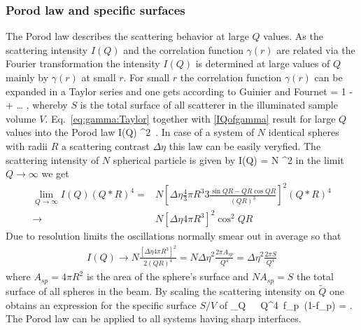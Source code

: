 \subsubsection{Porod law and specific surfaces}

The Porod law describes the scattering behavior at large $Q$ values.
As the scattering intensity $I(Q)$ and the correlation function $\gamma(r)$
are related via the Fourier transformation the intensity $I(Q)$ is determined
at large values of $Q$ mainly by $\gamma(r)$ at small $r$. For small $r$  the
correlation function $\gamma(r)$ can be expanded in a Taylor series and one
gets according to Guinier and Fournet \cite{book:Guinier:Fournet}
\BE
{} = 1 -  \,  + \dots
\quad ,
\label{eq:gamma:Taylor}
\EE
whereby $S$ is the total surface of all scatterer in the illuminated sample volume $V$.
Eq.\ \ref{eq:gamma:Taylor} together with \ref{IQofgamma} result for large
$Q$ values into the Porod law
\BE
I(Q) \longrightarrow \Delta\eta^2\,  .
\label{eq:Porodlaw}
\EE
In case of a system of $N$ identical spheres with radii $R$ a scattering contrast $\Delta \eta$ this law can be easily veryfied. The scattering intensity of $N$ spherical particle is given by
\BE
I(Q) = N ^2
\EE
in the limit $Q \rightarrow \infty$ we get
\begin{align}\label{eq:speherePorodLaw}
  \lim_{Q \rightarrow \infty} I(Q) (Q*R)^4 = & N \left[ \Delta\eta  \frac{4}{3}\pi R^3 3 \frac{\sin QR - QR \cos QR}{(QR)^3}\right]^2 (Q*R)^4\\
    \rightarrow & N \left[\Delta\eta 4 \pi R^3 \right]^2 \cos^2 QR
\end{align}
Due to resolution limits the oscillations normally smear out in average so that
\begin{align}\label{eq:speherePorodLaw}
I(Q) \rightarrow N\frac{\left[\Delta\eta 4\pi R^3 \right]^2 }{2 (QR)^4} = N \Delta\eta^2\frac{2\pi A_{sp}}{Q^4} =  \Delta\eta^2\frac{2\pi S}{Q^4}
\end{align}
where $A_{sp}=4\pi R^2$ is the area of the sphere's surface and $N A_{sp}=S$ the total surface of all spheres in the beam.
By scaling the scattering intensity on $\tilde Q$ one obtains an expression
for the specific surface $S/V$ of
\BE
\lim_{Q\rightarrow \infty} \, \pi\,\, Q^4\, f_p\,
(1-f_p) =  .
\label{eq:spez:surface}
\EE
The Porod law can be applied to all systems having sharp interfaces.
